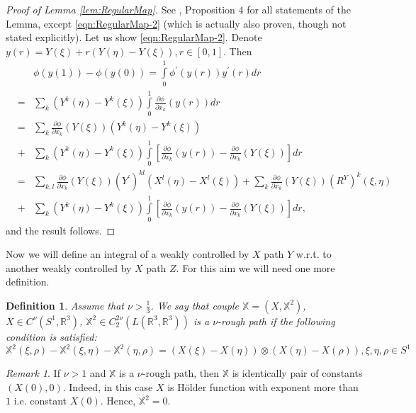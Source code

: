 \documentclass[11pt,a4paper,leqno]{amsart}%
\theoremstyle{plain}
\theoremstyle{remark}
\newtheorem{remark}[theorem]{Remark}
\theoremstyle{plain}
\newtheorem{definition}[theorem]{Definition}
\numberwithin{equation}{section}
\def\Rnu{{\mathbb R}}
\def\suml{\sum\limits}
\def\intl{\int\limits}
\begin{document}
\begin{proof}[ Proof of Lemma \ref{lem:RegularMap}]
See \cite{[Gubinelli-2004]}, Proposition $4$ for all statements of
the Lemma, except \eqref{eqn:RegularMap-2} (which is actually also
proven, though not stated explicitly). Let us show
\eqref{eqn:RegularMap-2}. Denote
$y(r)=Y(\xi)+r(Y(\eta)-Y(\xi)),r\in[0,1]$. Then
\begin{eqnarray}
\label{eqn:RegularMap-2proof}
&&
\phi(y(1))-\phi(y(0))=\intl_0^1\phi^\prime(y(r))y^\prime(r)dr
\\
\nonumber
&=&\suml_k(Y^k(\eta)-Y^k(\xi))\intl_0^1\frac{\partial\phi}{\partial
x_k}(y(r))dr\\
&=&\suml_k\frac{\partial\phi}{\partial
x_k}(Y(\xi))(Y^k(\eta)-Y^k(\xi))\nonumber
\\
&+&\suml_k(Y^k(\eta)-Y^k(\xi))\intl_0^1[\frac{\partial\phi}{\partial
x_k}(y(r))-\frac{\partial\phi}{\partial x_k}(Y(\xi))]dr\nonumber
\\
&=&\suml_{k,l}\frac{\partial\phi}{\partial
x_k}(Y(\xi))(Y^\prime)^{kl}(X^l(\eta)-X^l(\xi))
+\suml_{k}\frac{\partial\phi}{\partial
x_k}(Y(\xi))(R^Y)^k(\xi,\eta)\nonumber
\\
&+&\suml_k(Y^k(\eta)-Y^k(\xi))\intl_0^1[\frac{\partial\phi}{\partial
x_k}(y(r))-\frac{\partial\phi}{\partial
x_k}(Y(\xi))]dr,
\nonumber
\end{eqnarray}
and the result follows.
\end{proof}
Now we will define an integral of a weakly controlled by $X$ path $Y$  w.r.t.
to another weakly controlled by $X$ path $Z$. For this aim  we will need one more
definition.
\begin{definition}\label{def:RoughPath}
Assume that  $\nu>\frac{1}{3}$. We say that couple
$\mathbb{X}=(X,\mathbb{X}^2)$, $X\in C^{\nu}(S^1,\Rnu^3)$,
$\mathbb{X}^2\in C_2^{2\nu}(L(\Rnu^3,\Rnu^3))$ is a $\nu$-rough
path if the following condition is satisfied:
\begin{equation}\label{eqn:CompatCondition}
\mathbb{X}^{2}(\xi,\rho)-\mathbb{X}^{2}(\xi,\eta)-\mathbb{X}^{2}(\eta,\rho)
=(X(\xi)-X(\eta))\otimes(X(\eta)-X(\rho)), \xi,\eta,\rho\in S^1
\end{equation}
\end{definition}
\begin{remark}
If $\nu>1$ and $\mathbb{X}$ is a $\nu$-rough path, then
$\mathbb{X}$ is identically pair of constants $(X(0),0)$. Indeed,
in this case $X$ is H\"older function with exponent more than $1$
i.e. constant $X(0)$. Hence, $\mathbb{X}^{2}=0$.
\end{remark}
\end{document}
